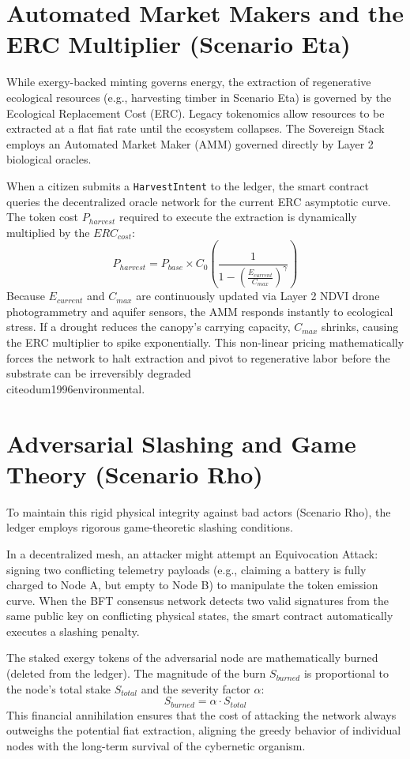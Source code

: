 \section{Automated Market Makers and the ERC Multiplier (Scenario Eta)}
While exergy-backed minting governs energy, the extraction of regenerative ecological resources (e.g., harvesting timber in Scenario Eta) is governed by the Ecological Replacement Cost (ERC). Legacy tokenomics allow resources to be extracted at a flat fiat rate until the ecosystem collapses. The Sovereign Stack employs an Automated Market Maker (AMM) governed directly by Layer 2 biological oracles.

When a citizen submits a \texttt{HarvestIntent} to the ledger, the smart contract queries the decentralized oracle network for the current ERC asymptotic curve. The token cost $P_{harvest}$ required to execute the extraction is dynamically multiplied by the $ERC_{cost}$:
\begin{equation}
P_{harvest} = P_{base} \times C_0 \left( \frac{1}{1 - \left( \frac{E_{current}}{C_{max}} \right)^\gamma} \right)
\end{equation}
Because $E_{current}$ and $C_{max}$ are continuously updated via Layer 2 NDVI drone photogrammetry and aquifer sensors, the AMM responds instantly to ecological stress. If a drought reduces the canopy's carrying capacity, $C_{max}$ shrinks, causing the ERC multiplier to spike exponentially. This non-linear pricing mathematically forces the network to halt extraction and pivot to regenerative labor before the substrate can be irreversibly degraded \\cite{odum1996environmental}.

\section{Adversarial Slashing and Game Theory (Scenario Rho)}
To maintain this rigid physical integrity against bad actors (Scenario Rho), the ledger employs rigorous game-theoretic slashing conditions. 

In a decentralized mesh, an attacker might attempt an Equivocation Attack: signing two conflicting telemetry payloads (e.g., claiming a battery is fully charged to Node A, but empty to Node B) to manipulate the token emission curve. When the BFT consensus network detects two valid signatures from the same public key on conflicting physical states, the smart contract automatically executes a slashing penalty.

The staked exergy tokens of the adversarial node are mathematically burned (deleted from the ledger). The magnitude of the burn $S_{burned}$ is proportional to the node's total stake $S_{total}$ and the severity factor $\alpha$:
\begin{equation}
S_{burned} = \alpha \cdot S_{total}
\end{equation}
This financial annihilation ensures that the cost of attacking the network always outweighs the potential fiat extraction, aligning the greedy behavior of individual nodes with the long-term survival of the cybernetic organism.

